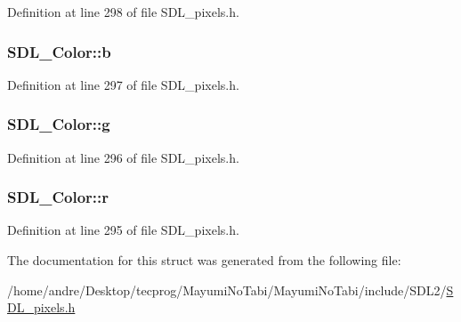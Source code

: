 Definition at line 298 of file S\-D\-L\-\_\-pixels.\-h.

\hypertarget{struct_s_d_l___color_a3b79a27e0414049559aa5bcf241dedd3}{
\subsubsection[{b}]{ S\-D\-L\-\_\-\-Color\-::b}}\label{struct_s_d_l___color_a3b79a27e0414049559aa5bcf241dedd3}


Definition at line 297 of file S\-D\-L\-\_\-pixels.\-h.

\hypertarget{struct_s_d_l___color_ae29d881bf740cfa7078b36e07f85d298}{
\subsubsection[{g}]{ S\-D\-L\-\_\-\-Color\-::g}}\label{struct_s_d_l___color_ae29d881bf740cfa7078b36e07f85d298}


Definition at line 296 of file S\-D\-L\-\_\-pixels.\-h.

\hypertarget{struct_s_d_l___color_a0bb975b6829524133fdd3c6060cfa63d}{
\subsubsection[{r}]{ S\-D\-L\-\_\-\-Color\-::r}}\label{struct_s_d_l___color_a0bb975b6829524133fdd3c6060cfa63d}


Definition at line 295 of file S\-D\-L\-\_\-pixels.\-h.



The documentation for this struct was generated from the following file\-:\begin{DoxyCompactItemize}
\item 
/home/andre/\-Desktop/tecprog/\-Mayumi\-No\-Tabi/\-Mayumi\-No\-Tabi/include/\-S\-D\-L2/\hyperlink{_s_d_l__pixels_8h}{S\-D\-L\-\_\-pixels.\-h}\end{DoxyCompactItemize}
